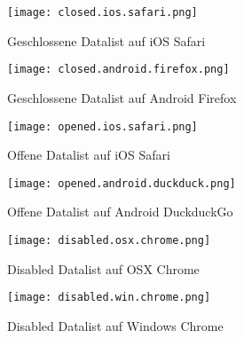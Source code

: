 
\begin{figure}[!htb]
    \centering
    \begin{minipage}[b]{0.45\textwidth}
        \centering
        \texttt{[image: closed.ios.safari.png]}
        \caption{\centering Geschlossene Datalist auf iOS Safari}
        \label{img:closedIosSafariDatalist}
    \end{minipage}
    \hfill
    \begin{minipage}[b]{0.45\textwidth}
        \centering
        \texttt{[image: closed.android.firefox.png]}
        \caption{\centering Geschlossene Datalist auf Android Firefox}
        \label{img:closedAndroidFirefoxDatalist}
    \end{minipage}
\end{figure}

\begin{figure}[!htb]
    \centering
    \begin{minipage}[b]{0.45\textwidth}
        \centering
        \texttt{[image: opened.ios.safari.png]}
        \caption{\centering Offene Datalist auf iOS Safari}
        \label{img:openedIosSafariDatalist}
    \end{minipage}
    \hfill
    \begin{minipage}[b]{0.45\textwidth}
        \centering
        \texttt{[image: opened.android.duckduck.png]}
        \caption{\centering Offene Datalist auf Android DuckduckGo}
        \label{img:openedAndroidDuckduckDatalist}
    \end{minipage}
\end{figure}


\begin{figure}[!htb]
    \centering
    \begin{minipage}[b]{0.45\textwidth}
        \centering
        \texttt{[image: disabled.osx.chrome.png]}
        \caption{\centering Disabled Datalist auf OSX Chrome}
        \label{img:disabledOsxChromeDatalist}
    \end{minipage}
    \hfill
    \begin{minipage}[b]{0.45\textwidth}
        \centering
        \texttt{[image: disabled.win.chrome.png]}
        \caption{\centering Disabled Datalist auf Windows Chrome}
        \label{img:disabledWinChromeDatalist}
    \end{minipage}
\end{figure}

